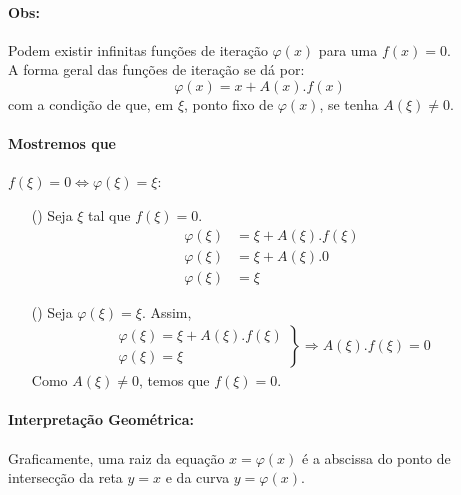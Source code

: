 \documentclass{article}
\begin{document}
        \paragraph{Obs:} Podem existir infinitas funções de iteração $\varphi(x)$ para uma $f(x) = 0$.\\

        A forma geral das funções de iteração se dá por:
        \[\varphi(x) = x + A(x).f(x)\]
        com a condição de que, em $\xi$, ponto fixo de $\varphi(x)$, se tenha $A(\xi) \neq 0$.

        \paragraph{Mostremos que} $f(\xi) = 0 \iff \varphi(\xi) = \xi$:
        \begin{itemize}
            \item[(\Rightarrow)] Seja $\xi$ tal que $f(\xi) = 0$.
                \begin{align*}
                    \varphi(\xi) &= \xi + A(\xi).f(\xi)\\
                    \varphi(\xi) &= \xi + A(\xi).0\\
                    \varphi(\xi) &= \xi
                \end{align*}
            \item[(\Leftarrow)] Seja $\varphi(\xi) = \xi$. Assim,
                \begin{align*}
                    \left.\begin{array}{l} \varphi(\xi) = \xi + A(\xi).f(\xi)\\ \varphi(\xi) = \xi\end{array}\right\}
                    \Rightarrow{} A (\xi).f (\xi) = 0
                \end{align*}
                Como $A(\xi) \neq 0$, temos que $f(\xi) = 0$.\quad\square{}{}
        \end{itemize}

        \paragraph{Interpretação Geométrica:} Graficamente, uma raiz da equação $x = \varphi(x)$ é a abscissa do ponto de intersecção da reta $y = x$ e da curva $y = \varphi(x)$.
\end{document}
